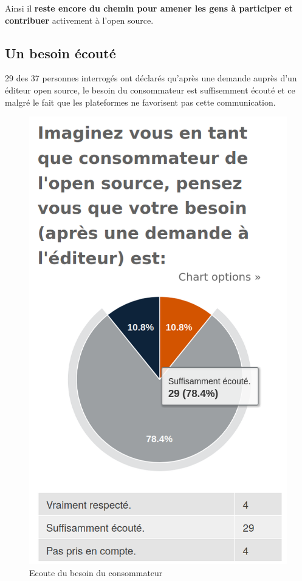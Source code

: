 			Ainsi il \textbf{reste encore du chemin pour amener les gens à participer et contribuer} activement à l'open source.

		\subsection{Un besoin écouté}

			29 des 37 personnes interrogés ont déclarés qu'après une demande auprès d'un éditeur open source, le besoin du consommateur est suffisemment écouté et ce malgré le fait que les plateformes ne favorisent pas cette communication.

			\begin{figure}[!htb]
				\center
				\includegraphics[scale=0.28]{./img/a12}
				\caption{Ecoute du besoin du consommateur}
			\end{figure}

